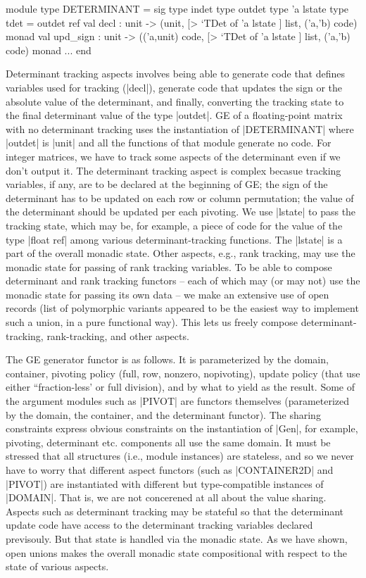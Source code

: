 \documentclass{llncs}
\begin{document}
\begin{code}
module type DETERMINANT = sig
  type indet  type outdet  type 'a lstate
  type tdet = outdet ref   
  val decl : unit -> 
    (unit, [> `TDet of 'a lstate ] list, ('a,'b) code) monad
  val upd_sign : unit -> 
    (('a,unit) code, [> `TDet of 'a lstate ] list, ('a,'b) code) monad
  ...
end
\end{code}
\noindent  Determinant tracking aspects involves being able to
generate code that defines variables used for tracking (|decl|),
generate code that updates the sign or the absolute
value of the determinant, and finally, converting the tracking state
to the final determinant value of the type |outdet|. GE of a
floating-point matrix with no determinant tracking uses the
instantiation of |DETERMINANT| where |outdet| is |unit| and all the
functions of that module generate no code. For integer matrices, we
have to track some aspects of the determinant even if we don't output
it. The determinant tracking aspect is complex becasue tracking
variables, if any, are to be declared at the beginning of GE; the sign
of the determinant has to be updated on each row or column
permutation; the value of the determinant should be updated per each
pivoting. We use |lstate| to pass the tracking state, which may be, for
example, a piece of code for the value of the type |float ref| among
various determinant-tracking functions. The |lstate| is a part of the
overall monadic state. Other aspects, e.g., rank tracking, may use the
monadic state for passing of rank tracking variables. To be able to
compose determinant and rank tracking functors -- each of which may
(or may not) use the monadic state for passing its own data -- we make
an extensive use of open records (list of polymorphic variants
appeared to be the easiest way to implement such a union, in a pure
functional way). This lets us freely compose determinant-tracking,
rank-tracking, and other aspects.

The GE generator functor is as follows. It is
parameterized by the domain, container, pivoting policy (full, row,
nonzero, nopivoting), update policy (that use either ``fraction-less'
or full division), and by what to yield as the result. Some of the
argument modules such as |PIVOT| are functors themselves (parameterized
by the domain, the container, and the determinant functor). The sharing
constraints express obvious constraints on the instantiation of |Gen|,
for example, pivoting, determinant etc. components all use the same
domain. It must be stressed that all structures (i.e., module
instances) are stateless, and so we never have to worry that different
aspect functors (such as |CONTAINER2D| and |PIVOT|) are instantiated
with different but type-compatible instances of |DOMAIN|. That is, we
are not concerened at all about the value sharing. Aspects such as
determinant tracking may be stateful so that the determinant update
code have access to the determinant tracking variables declared
previsouly. But that state is handled via the monadic state. As we
have shown, open unions makes the overall monadic state compositional
with respect to the state of various aspects.
\end{document}
